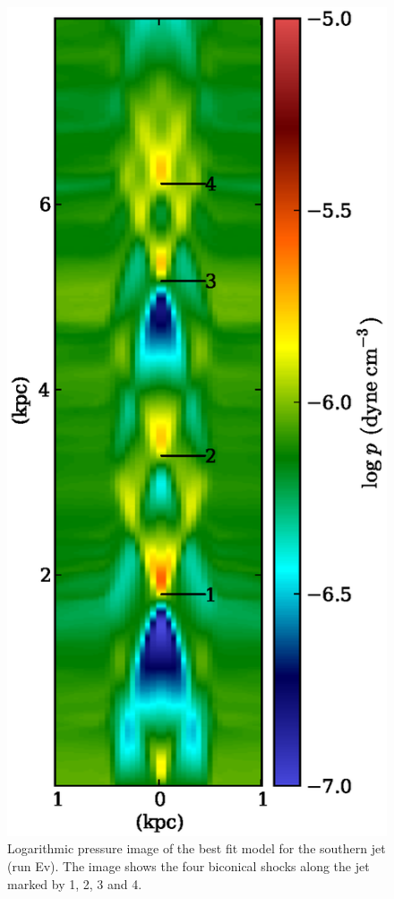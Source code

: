 \begin{figure}[ht!]
\includegraphics[width=\linewidth]{sbm.eps}
\caption{Logarithmic pressure image of the best fit model for the southern jet (run Ev). The image shows the four biconical shocks along the jet marked by 1, 2, 3 and 4.}
\label{m_s_p}
\end{figure}


